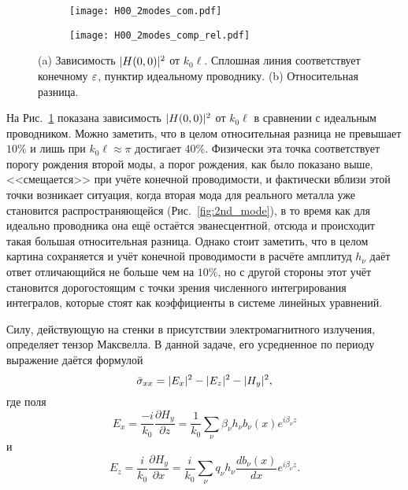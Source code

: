 \begin{figure}
  \begin{subfigure}[t]{0.45\textwidth}
    \texttt{[image: H00\_2modes\_com.pdf]}
  \end{subfigure}
  \begin{subfigure}[t]{0.45\textwidth}
    \texttt{[image: H00\_2modes\_comp\_rel.pdf]}
  \end{subfigure}
  \caption{(a) Зависимость $\lvert H(0,0)\rvert^2$ от $k_0 \ell$. Сплошная линия соответствует конечному $\varepsilon$, пунктир идеальному проводнику. (b) Относительная разница.}	\label{pic:comp}
\end{figure}

На Рис.~\ref{pic:comp} показана зависимость $\lvert H(0,0)\rvert^2$ от $k_0 \ell$ в сравнении с идеальным проводником. Можно заметить, что в целом 
относительная разница не превышает  $10\%$ и лишь при  $k_0 \ell \approx \pi$ достигает $40\%$. Физически эта точка 
соответствует порогу рождения второй моды, а порог рождения, как было показано выше, <<смещается>> при учёте конечной проводимости, и фактически
вблизи этой точки возникает ситуация, когда вторая мода для реального металла уже становится распространяющейся (Рис.~\ref{fig:2nd_mode}), 
в то время как для идеально проводника
она ещё остаётся эванесцентной, отсюда и происходит такая большая относительная разница. Однако стоит заметить, что в целом картина сохраняется
и учёт конечной проводимости в расчёте амплитуд $h_\nu$ даёт ответ отличающийся не больше чем на $10\%$, но с другой стороны этот учёт 
становится дорогостоящим с точки зрения численного интегрирования интегралов, которые стоят как коэффициенты в системе линейных уравнений.

Силу, действующую на стенки в присутствии электромагнитного излучения, определяет тензор Максвелла. В данной задаче, его усредненное по
периоду выражение даётся формулой
\begin{equation}
\bar{\sigma}_{xx} = \lvert E_x\rvert^2 - \lvert E_z\rvert^2 - \lvert H_y\rvert^2,
\end{equation}
где поля 
\begin{equation*}
E_x = \frac{-i}{k_0}\frac{\partial H_y}{\partial z} = \frac{1}{k_0}\sum_{\nu}\beta_\nu h_\nu b_\nu(x) e^{i \beta_\nu z}
\end{equation*}
и
\begin{equation*}
E_z = \frac{i}{k_0}\frac{\partial H_y}{\partial x} = \frac{i}{k_0}\sum_{\nu} q_\nu h_\nu  \frac{d b_\nu(x)}{d x} e^{i \beta_\nu z}.
\end{equation*}

